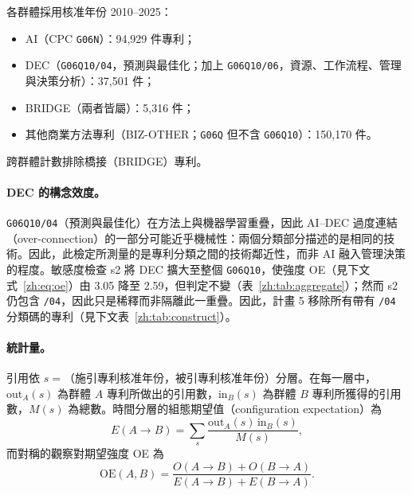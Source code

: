 各群體採用核准年份 2010--2025：
\begin{itemize}
  \item AI（CPC \texttt{G06N}）：94,929 件專利；
  \item DEC（\texttt{G06Q10/04}，預測與最佳化；加上 \texttt{G06Q10/06}，資源、工作流程、管理與決策分析）：37,501 件；
  \item BRIDGE（兩者皆屬）：5,316 件；
  \item 其他商業方法專利（BIZ-OTHER；\texttt{G06Q} 但不含 \texttt{G06Q10}）：150,170 件。
\end{itemize}
跨群體計數排除橋接（BRIDGE）專利。

\paragraph{DEC 的構念效度。} \texttt{G06Q10/04}（預測與最佳化）在方法上與機器學習重疊，因此 AI--DEC 過度連結（over-connection）的一部分可能近乎機械性：兩個分類部分描述的是相同的技術。因此，此檢定所測量的是專利分類之間的技術鄰近性，而非 AI 融入管理決策的程度。敏感度檢查 s2 將 DEC 擴大至整個 \texttt{G06Q10}，使強度 OE（見下文式~\eqref{zh:eq:oe}）由 3.05 降至 2.59，但判定不變（表~\ref{zh:tab:aggregate}）；然而 s2 仍包含 \texttt{/04}，因此只是稀釋而非隔離此一重疊。因此，計畫 5 移除所有帶有 \texttt{/04} 分類碼的專利（見下文表~\ref{zh:tab:construct}）。

\paragraph{統計量。} 引用依 $s = $（施引專利核准年份，被引專利核准年份）分層。在每一層中，$\mathrm{out}_A(s)$ 為群體 $A$ 專利所做出的引用數，$\mathrm{in}_B(s)$ 為群體 $B$ 專利所獲得的引用數，$M(s)$ 為總數。時間分層的組態期望值（configuration expectation）為
\begin{equation}
E(A\!\rightarrow\!B) = \sum_{s} \frac{\mathrm{out}_A(s)\,\mathrm{in}_B(s)}{M(s)} ,
\label{zh:eq:patent_expected}
\end{equation}
而對稱的觀察對期望強度 OE 為
\begin{equation}
\mathrm{OE}(A,B) = \frac{O(A\!\rightarrow\!B) + O(B\!\rightarrow\!A)}{E(A\!\rightarrow\!B) + E(B\!\rightarrow\!A)} .
\label{zh:eq:oe}
\end{equation}

